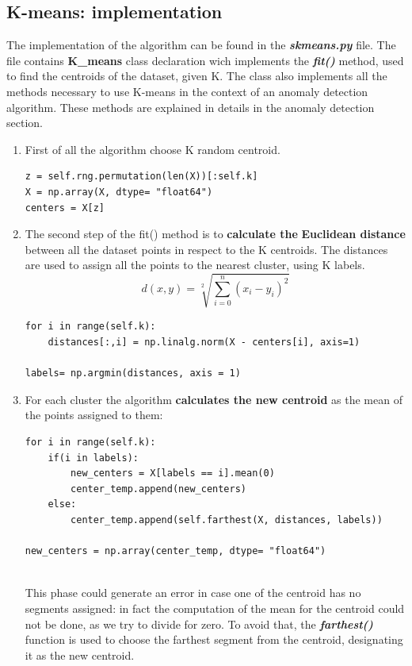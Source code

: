 \documentclass[12pt]{article}
\begin{document}
	\subsection{K-means: implementation}
		The implementation of the algorithm can be found in the \textbf{\textit{skmeans.py}} file. The file contains \textbf{K\_means} class declaration wich implements the \textbf{\textit{fit()}} method, used to find the centroids of the dataset, given K. The class also implements all the methods necessary to use K-means in the context of an anomaly detection algorithm. These methods are explained in details in the anomaly detection section.\\
		\begin{enumerate}
			\item First of all the algorithm choose K random centroid.
				\begin{lstlisting}
z = self.rng.permutation(len(X))[:self.k]
X = np.array(X, dtype= "float64")
centers = X[z]
				\end{lstlisting}
			\item The second step of the fit() method is to \textbf{calculate the} \textbf{Euclidean distance} between all the dataset points in respect to the K centroids. The distances are used to assign all the points to the nearest cluster, using K labels. 
			$$d(x,y) = \sqrt[2]{\sum_{i=0}^n (x_{i} - y_{i})^{2}} $$
				\begin{lstlisting}
for i in range(self.k):
	distances[:,i] = np.linalg.norm(X - centers[i], axis=1)	
			
labels= np.argmin(distances, axis = 1)
				\end{lstlisting}
			
			\item For each cluster the algorithm \textbf{calculates the new centroid} as the mean of the points assigned to them:
			
				\begin{lstlisting}
for i in range(self.k):
	if(i in labels):
		new_centers = X[labels == i].mean(0)
		center_temp.append(new_centers)
	else:
		center_temp.append(self.farthest(X, distances, labels))
		
new_centers = np.array(center_temp, dtype= "float64")
					
				\end{lstlisting}
				This phase could generate an error in case one of the centroid has no segments assigned: in fact the computation of the mean for the centroid could not be done, as we try to divide for zero. To avoid that, the \textbf{\textit{farthest()}} function is used to choose the farthest segment from the centroid, designating it as the new centroid.
				

\end{enumerate}
\end{document}
